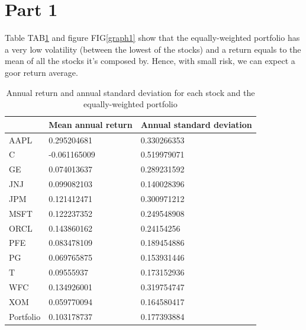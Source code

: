 \documentclass[a4paper,11pt,twoside]{article}
\begin{document}
\section{Part 1}

Table TAB\ref{table1} and figure FIG\ref{graph1} show that the equally-weighted portfolio has a very low volatility (between the lowest of the stocks) and a return equals to the mean of all the stocks it's composed by. Hence, with small risk, we can expect a goor return average.

\begin{center} %
\begin{table}[H]
\centering
\begin{tabular}[h] {| l | l  l |}
\hline
& Mean annual return & Annual standard deviation\\
\hline
\hline
AAPL & 0.295204681  & 0.330266353 \\
C    & -0.061165009 & 0.519979071 \\
GE   & 0.074013637  & 0.289231592 \\
JNJ  & 0.099082103  & 0.140028396 \\
JPM  & 0.121412471  & 0.300971212 \\
MSFT & 0.122237352  & 0.249548908 \\
ORCL & 0.143860162  & 0.24154256  \\
PFE  & 0.083478109  & 0.189454886 \\
PG   & 0.069765875  & 0.153931446 \\
T    & 0.09555937   & 0.173152936 \\
WFC  & 0.134926001  & 0.319754747 \\
XOM  & 0.059770094  & 0.164580417 \\
\hline
Portfolio		&0.103178737			&0.177393884		\\
\hline
\end{tabular}
\label{table1}
\caption{Annual return and annual standard deviation for each stock and the equally-weighted portfolio}
\end{table}
\end{center}
\end{document}
